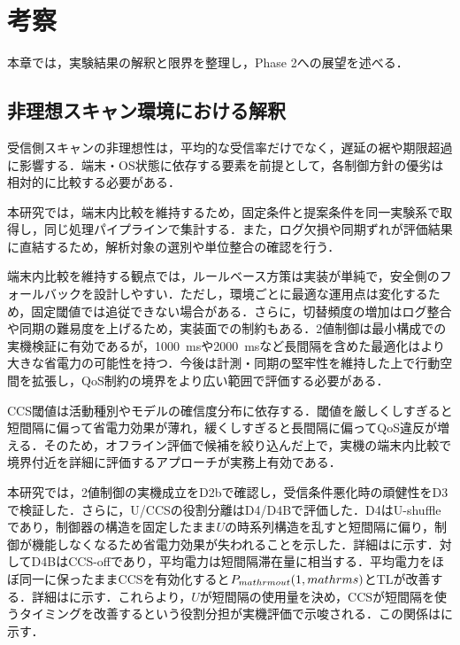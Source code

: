 \chapter{考察}
\label{ch:discussion}
\clearpage

本章では，実験結果の解釈と限界を整理し，Phase 2への展望を述べる．

\section{非理想スキャン環境における解釈}
受信側スキャンの非理想性は，平均的な受信率だけでなく，遅延の裾や期限超過に影響する．端末・OS状態に依存する要素を前提として，各制御方針の優劣は相対的に比較する必要がある．

本研究では，端末内比較を維持するため，固定条件と提案条件を同一実験系で取得し，同じ処理パイプラインで集計する．また，ログ欠損や同期ずれが評価結果に直結するため，解析対象の選別や単位整合の確認を行う．

端末内比較を維持する観点では，ルールベース方策は実装が単純で，安全側のフォールバックを設計しやすい．ただし，環境ごとに最適な運用点は変化するため，固定閾値では追従できない場合がある．さらに，切替頻度の増加はログ整合や同期の難易度を上げるため，実装面での制約もある．2値制御は最小構成での実機検証に有効であるが，\SI{1000}{\milli\second}や\SI{2000}{\milli\second}など長間隔を含めた最適化はより大きな省電力の可能性を持つ．今後は計測・同期の堅牢性を維持した上で行動空間を拡張し，QoS制約の境界をより広い範囲で評価する必要がある．

CCS閾値は活動種別やモデルの確信度分布に依存する．閾値を厳しくしすぎると短間隔に偏って省電力効果が薄れ，緩くしすぎると長間隔に偏ってQoS違反が増える．そのため，オフライン評価で候補を絞り込んだ上で，実機の端末内比較で境界付近を詳細に評価するアプローチが実務上有効である．

\label{sec:discussion_role_separation}本研究では，2値制御の実機成立をD2bで確認し，受信条件悪化時の頑健性をD3で検証した．さらに，U/CCSの役割分離はD4/D4Bで評価した．D4はU-shuffleであり，制御器の構造を固定したまま$U$の時系列構造を乱すと短間隔に偏り，制御が機能しなくなるため省電力効果が失われることを示した．詳細はに示す．対してD4BはCCS-offであり，平均電力は短間隔滞在量に相当する．平均電力をほぼ同一に保ったままCCSを有効化すると$P_{\\mathrm{out}}(1\\,\\mathrm{s})$とTLが改善する．詳細はに示す．これらより，$U$が短間隔の使用量を決め，CCSが短間隔を使うタイミングを改善するという役割分担が実機評価で示唆される．この関係はに示す．

